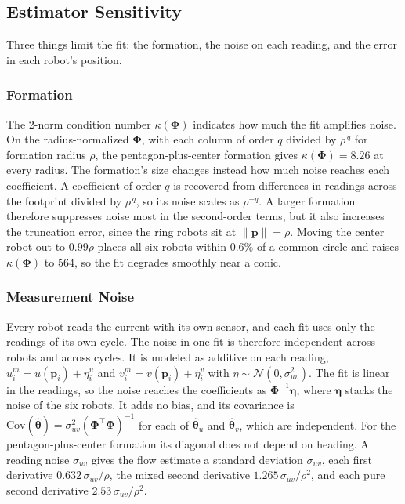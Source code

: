 \subsection{Estimator Sensitivity}
\label{sec:ch7:sensitivity}

Three things limit the fit: the formation, the noise on each reading,
and the error in each robot's position.

\subsubsection{Formation}
The 2-norm condition number $\kappa(\boldsymbol{\Phi})$ indicates how much
the fit amplifies noise. On the radius-normalized $\boldsymbol{\Phi}$, with
each column of order $q$ divided by $\rho^{\,q}$ for formation radius
$\rho$, the pentagon-plus-center formation gives
$\kappa(\boldsymbol{\Phi}) = 8.26$ at every radius. The formation's size
changes instead how much noise reaches each coefficient. A coefficient of order $q$ is recovered
from differences in readings across the footprint divided by
$\rho^{\,q}$, so its noise scales as $\rho^{-q}$. A larger formation
therefore suppresses noise most in the second-order terms, but it also
increases the truncation error, since the ring robots sit at
$\|\mathbf{p}\| = \rho$. Moving the center robot out to $0.99\rho$
places all six robots within $0.6\%$ of a common circle and raises
$\kappa(\boldsymbol{\Phi})$ to $564$, so the fit degrades smoothly near
a conic.

\subsubsection{Measurement Noise}
Every robot reads the current with its own sensor, and each fit uses only
the readings of its own cycle. The noise in one fit is therefore
independent across robots and across cycles. It is modeled as additive on
each reading, $u_i^m = u(\mathbf{p}_i) + \eta_i^u$ and
$v_i^m = v(\mathbf{p}_i) + \eta_i^v$ with
$\eta \sim \mathcal{N}(0, \sigma_{uv}^2)$. The fit is linear in the
readings, so the noise reaches the coefficients as
$\boldsymbol{\Phi}^{-1}\boldsymbol{\eta}$, where $\boldsymbol{\eta}$
stacks the noise of the six robots. It adds no bias, and its covariance is
$\mathrm{Cov}(\hat{\boldsymbol{\theta}}) =
\sigma_{uv}^2(\boldsymbol{\Phi}^\top\boldsymbol{\Phi})^{-1}$ for each of
$\hat{\boldsymbol{\theta}}_u$ and $\hat{\boldsymbol{\theta}}_v$, which
are independent. For the pentagon-plus-center formation its diagonal does
not depend on heading. A reading noise $\sigma_{uv}$ gives the flow estimate a standard deviation
$\sigma_{uv}$, each first derivative $0.632\,\sigma_{uv}/\rho$, the
mixed second derivative $1.265\,\sigma_{uv}/\rho^2$, and each pure
second derivative $2.53\,\sigma_{uv}/\rho^2$.

